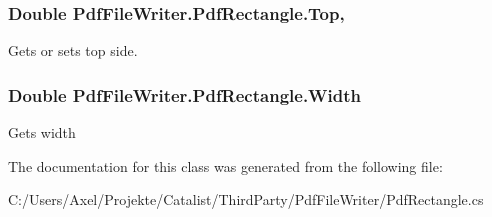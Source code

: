 \subsubsection[{\texorpdfstring{Top}{Top}}]{\setlength{\rightskip}{0pt plus 5cm}Double Pdf\+File\+Writer.\+Pdf\+Rectangle.\+Top\hspace{0.3cm}{\ttfamily [get]}, {\ttfamily [set]}}\hypertarget{class_pdf_file_writer_1_1_pdf_rectangle_a6f32d2a09f4e0bb8168a4633fb585ff9}{}\label{class_pdf_file_writer_1_1_pdf_rectangle_a6f32d2a09f4e0bb8168a4633fb585ff9}


Gets or sets top side. 

\subsubsection[{\texorpdfstring{Width}{Width}}]{\setlength{\rightskip}{0pt plus 5cm}Double Pdf\+File\+Writer.\+Pdf\+Rectangle.\+Width\hspace{0.3cm}{\ttfamily [get]}}\hypertarget{class_pdf_file_writer_1_1_pdf_rectangle_a1f512a0417ad053ea4b29df9e31adff7}{}\label{class_pdf_file_writer_1_1_pdf_rectangle_a1f512a0417ad053ea4b29df9e31adff7}


Gets width 



The documentation for this class was generated from the following file\+:\begin{DoxyCompactItemize}
\item 
C\+:/\+Users/\+Axel/\+Projekte/\+Catalist/\+Third\+Party/\+Pdf\+File\+Writer/Pdf\+Rectangle.\+cs\end{DoxyCompactItemize}
